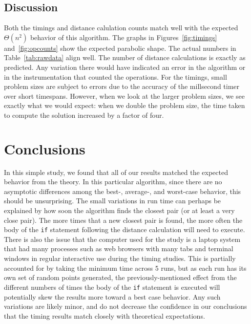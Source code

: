 \documentclass[12pt]{article}
\begin{document}
\subsection{Discussion}

Both the timings and distance calulation counts match well with the
expected $\Theta(n^2)$ behavior of this algorithm.  The graphs in
Figures~\ref{fig:timings} and~\ref{fig:opcounts} show the expected
parabolic shape.  The actual numbers in Table~\ref{tab:rawdata} align
well.  The number of distance calculations is exactly as predicted.
Any variation there would have indicated an error in the algorithm or
in the instrumentation that counted the operations.  For the timings,
small problem sizes are subject to errors due to the accuracy of the
millsecond timer over short timespans.  However, when we look at the
larger problem sizes, we see exactly what we would expect: when we
double the problem size, the time taken to compute the solution
increased by a factor of four.

\section{Conclusions}
\label{sec:conclusions}

In this simple study, we found that all of our results matched the
expected behavior from the theory.  In this particular algorithm,
since there are no asymptotic differences among the best-, average-,
and worst-case behavior, this should be unsurprising.  The small
variations in run time can perhaps be explained by how soon the
algorithm finds the closest pair (or at least a very close pair).  The
more times that a new closest pair is found, the more often the body
of the \texttt{if} statement following the distance calculation will
need to execute.  There is also the issue that the computer used for
the study is a laptop system that had many processes such as web
browsers with many tabs and terminal windows in regular interactive
use during the timing studies.  This is partially accounted for by
taking the minimum time across 5 runs, but as each run has its own set
of random points generated, the previously-mentioned effect from the
different numbers of times the body of the \texttt{if} statement is
executed will potentially skew the results more toward a best case
behavior.  Any such variations are likely minor, and do not decrease
the confidence in our conclusions that the timing results match
closely with theoretical expectations.
\end{document}
